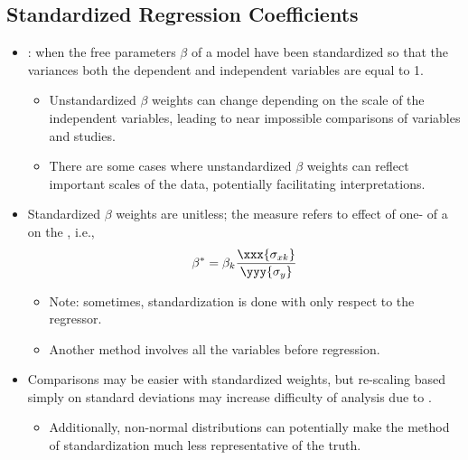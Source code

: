 \begin{itemize}
\begin{itemize}
\begin{itemize}
    \end{itemize}
  \end{itemize}

  \subsection{Standardized Regression Coefficients}
  \begin{itemize}
    \item {}: when the free parameters \(\beta\) of a model have been standardized so that the variances both the dependent and independent variables are equal to 1.
      \begin{itemize}
        \item Unstandardized \(\beta \) weights can change depending on the scale of the independent variables, leading to near impossible comparisons of variables and studies.
        \item There are some cases where unstandardized \(\beta \) weights can reflect important scales of the data, potentially facilitating interpretations.
      \end{itemize}
    \item Standardized \(\beta \) weights are unitless; the measure refers to effect of one-\hyperref[Subsection: Measures of Dispersion]{} of a  on the , i.e.,
    \[%
    \beta^* = \beta_k\frac{\xxx{\sigma_{xk}}}{\yyy{\sigma_y}}
    \]%
    \begin{itemize}
      \item Note: sometimes, standardization is done with only respect to the regressor.
      \item Another method involves \hyperref[Subsection: Z-Score Standardization]{} all the variables before regression.
    \end{itemize}
    \item Comparisons may be easier with standardized weights, but re-scaling based simply on standard deviations may increase difficulty of analysis due to \hyperref[Section: Primer: Partial Correlation]{}.
      \begin{itemize}
        \item Additionally, non-normal distributions can potentially make the method of standardization much less representative of the truth.
      \end{itemize}
  \end{itemize}
  
\end{itemize}

